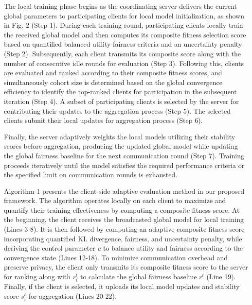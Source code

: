 \documentclass[pdflatex,sn-mathphys-num,oneside]{sn-jnl}%
\theoremstyle{thmstyleone}%
\theoremstyle{thmstyletwo}%
\theoremstyle{thmstylethree}%
\begin{document}
The local training phase begins as the coordinating server delivers the current global parameters to participating clients for local model initialization, as shown in Fig. 2 (Step 1). During each training round, participating clients locally train the received global model and then computes its composite fitness selection score based on quantified balanced utility-fairness criteria and an uncertainty penalty (Step 2). Subsequently, each client transmits its composite score along with the number of consecutive idle rounds for evaluation (Step 3). Following this, clients are evaluated and ranked according to their composite fitness scores, and simultaneously cohort size is determined based on the global convergence efficiency to identify the top-ranked clients for participation in the subsequent iteration (Step 4). A subset of participating clients is selected by the server for contributing their updates to the aggregation process (Step 5). The selected clients submit their local updates for aggregation process (Step 6). 

Finally, the server adaptively weights the local models utilizing their stability scores before aggregation, producing the updated global model while updating the global fairness baseline for the next communication round (Step 7). Training proceeds iteratively until the model satisfies the required performance criteria or the specified limit on communication rounds is exhausted.

Algorithm 1 presents the client-side adaptive evaluation method in our proposed framework. The algorithm operates locally on each client to maximize and quantify their training effectiveness by computing a composite fitness score. At the beginning, the client receives the broadcasted global model for local training (Lines 3-8). It is then followed by computing an adaptive composite fitness score incorporating quantified KL divergence, fairness, and uncertainty penalty, while deriving the control parameter \textit{a} to balance utility and fairness according to the convergence state (Lines 12-18). To minimize communication overhead and preserve privacy, the client only transmits its composite fitness score to the server for ranking along with $r_i^t$ to calculate the global fairness baseline $r^t$ (Line 19). Finally, if the client is selected, it uploads its local model updates and stability score $s_i^t$ for aggregation (Lines 20-22).

\vspace{5mm}
    
\begingroup
\small
\setlength{\tabcolsep}{3pt}
\renewcommand{\arraystretch}{0.92}
\end{document}
